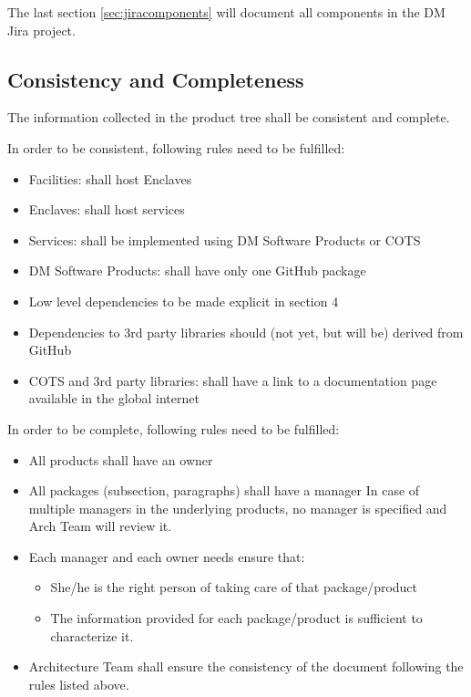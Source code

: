 The last section \ref{sec:jiracomponents} will document all components in the DM Jira project.
 

\subsection{Consistency and Completeness}\label{sec:cons-comp}

The information collected in the product tree shall be consistent and complete.

In order to be consistent, following rules need to be fulfilled:

\begin{itemize}
\item Facilities: shall host Enclaves
\item Enclaves: shall host services
\item Services: shall be implemented using DM Software Products or COTS
\item DM Software Products: shall have only one GitHub package
\item Low level dependencies to be made explicit in section 4
\item Dependencies to 3rd party libraries should (not yet, but will be) derived from GitHub
\item COTS and 3rd party libraries: shall have a link to a documentation page available in the global internet
\end{itemize}

In order to be complete, following rules need to be fulfilled:

\begin{itemize}
\item All products shall have an owner
\item All packages (subsection, paragraphs) shall have a manager
In case of multiple managers in the underlying products, no manager is specified and Arch Team will review it.
\item Each manager and each owner needs ensure that:
\begin{itemize}
\item She/he is the right person of taking care of that package/product
\item The information provided for each package/product is sufficient to characterize it.
\end{itemize}
\item Architecture Team shall ensure the consistency of the document following the rules listed above.
\end{itemize}


